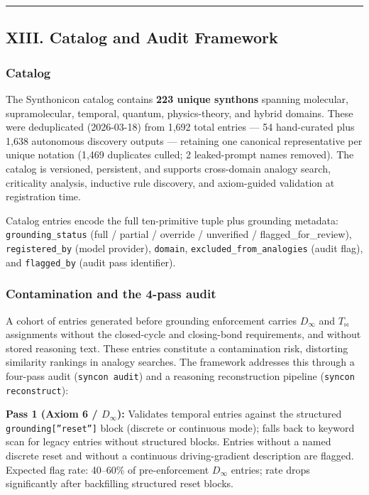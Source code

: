 \documentclass[12pt,a4paper]{article}
\begin{document}
\begin{center}
\rule{0.5\textwidth}{0.4pt}
\end{center}

\subsection{XIII. Catalog and Audit Framework}

\subsubsection{Catalog}

The Synthonicon catalog contains \textbf{223 unique synthons} spanning molecular, supramolecular, temporal, quantum, physics-theory, and hybrid domains. These were deduplicated (2026-03-18) from 1,692 total entries --- 54 hand-curated plus 1,638 autonomous discovery outputs --- retaining one canonical representative per unique notation (1,469 duplicates culled; 2 leaked-prompt names removed). The catalog is versioned, persistent, and supports cross-domain analogy search, criticality analysis, inductive rule discovery, and axiom-guided validation at registration time.

Catalog entries encode the full ten-primitive tuple plus grounding metadata: \texttt{grounding\_status} (full / partial / override / unverified / flagged\_for\_review), \texttt{registered\_by} (model provider), \texttt{domain}, \texttt{excluded\_from\_analogies} (audit flag), and \texttt{flagged\_by} (audit pass identifier).

\subsubsection{Contamination and the 4-pass audit}

A cohort of entries generated before grounding enforcement carries $D_{\infty}$ and $T_{\bowtie}$ assignments without the closed-cycle and closing-bond requirements, and without stored reasoning text. These entries constitute a contamination risk, distorting similarity rankings in analogy searches. The framework addresses this through a four-pass audit (\texttt{syncon audit}) and a reasoning reconstruction pipeline (\texttt{syncon reconstruct}):

\textbf{Pass 1 (Axiom 6 / $D_{\infty}$):} Validates temporal entries against the structured \texttt{grounding{[}''reset''{]}} block (discrete or continuous mode); falls back to keyword scan for legacy entries without structured blocks. Entries without a named discrete reset and without a continuous driving-gradient description are flagged. Expected flag rate: 40--60\% of pre-enforcement $D_{\infty}$ entries; rate drops significantly after backfilling structured reset blocks.
\end{document}
